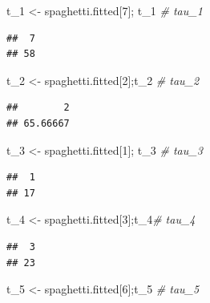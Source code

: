 \documentclass[12pt,]{article}
\newenvironment{Shaded}{\begin{snugshade}}{\end{snugshade}}
\newcommand{\DecValTok}[1]{\textcolor[rgb]{0.00,0.00,0.81}{#1}}
\newcommand{\StringTok}[1]{\textcolor[rgb]{0.31,0.60,0.02}{#1}}
\newcommand{\CommentTok}[1]{\textcolor[rgb]{0.56,0.35,0.01}{\textit{#1}}}
\newcommand{\NormalTok}[1]{#1}
\begin{document}
\begin{Shaded}
\begin{Highlighting}[]
\NormalTok{t_}\DecValTok{1}\NormalTok{ <-}\StringTok{ }\NormalTok{spaghetti.fitted[}\DecValTok{7}\NormalTok{]; t_}\DecValTok{1} \CommentTok{# tau_1}
\end{Highlighting}
\end{Shaded}

\begin{verbatim}
##  7 
## 58
\end{verbatim}

\begin{Shaded}
\begin{Highlighting}[]
\NormalTok{t_}\DecValTok{2}\NormalTok{ <-}\StringTok{ }\NormalTok{spaghetti.fitted[}\DecValTok{2}\NormalTok{];t_}\DecValTok{2} \CommentTok{# tau_2}
\end{Highlighting}
\end{Shaded}

\begin{verbatim}
##        2 
## 65.66667
\end{verbatim}

\begin{Shaded}
\begin{Highlighting}[]
\NormalTok{t_}\DecValTok{3}\NormalTok{ <-}\StringTok{ }\NormalTok{spaghetti.fitted[}\DecValTok{1}\NormalTok{]; t_}\DecValTok{3} \CommentTok{# tau_3}
\end{Highlighting}
\end{Shaded}

\begin{verbatim}
##  1 
## 17
\end{verbatim}

\begin{Shaded}
\begin{Highlighting}[]
\NormalTok{t_}\DecValTok{4}\NormalTok{ <-}\StringTok{ }\NormalTok{spaghetti.fitted[}\DecValTok{3}\NormalTok{];t_}\DecValTok{4}\CommentTok{# tau_4}
\end{Highlighting}
\end{Shaded}

\begin{verbatim}
##  3 
## 23
\end{verbatim}

\begin{Shaded}
\begin{Highlighting}[]
\NormalTok{t_}\DecValTok{5}\NormalTok{ <-}\StringTok{ }\NormalTok{spaghetti.fitted[}\DecValTok{6}\NormalTok{];t_}\DecValTok{5} \CommentTok{# tau_5}
\end{Highlighting}
\end{Shaded}
\end{document}
